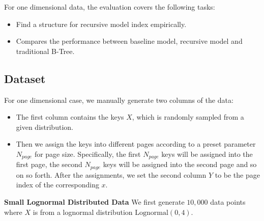 For one dimensional data, the evaluation covers the following tasks:

\begin{itemize}
	\item Find a structure for recursive model index empirically.
	\item Compares the performance between baseline model, recursive model and traditional B-Tree.
\end{itemize}

\subsection{Dataset}

For one dimensional case, we manually generate two columns of the data:

\begin{itemize}
	\item The first column contains the keys $X$, which is randomly sampled from a given distribution.
	\item Then we assign the keys into different pages according to a preset parameter $N_{page}$ for page size. Specifically, the first $N_{page}$ keys will be assigned into the first page, the second $N_{page}$ keys will be assigned into the second page and so on so forth. After the assignments, we set the second column $Y$ to be the page index of the corresponding $x$.
\end{itemize}

\textbf{Small Lognormal Distributed Data} We first generate $10,000$ data points where $X$ is from a lognormal distribution $\text{Lognormal}(0, 4)$. 

